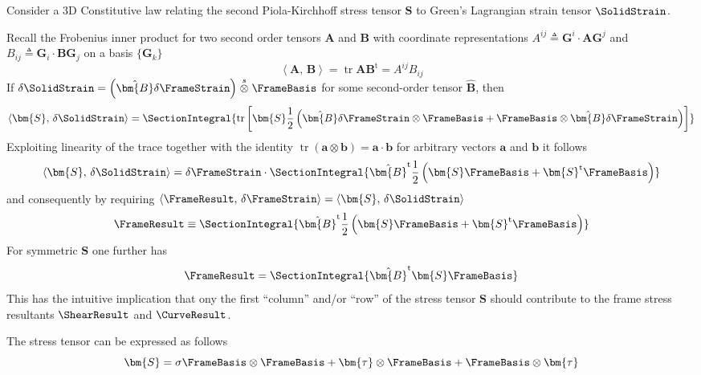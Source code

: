 Consider a 3D Constitutive law relating the second Piola-Kirchhoff stress tensor \(\bm{S}\) to Green's Lagrangian strain tensor \(\SolidStrain\).

Recall the Frobenius inner product for two second order tensors \(\bm{A}\) and \(\bm{B}\) with coordinate representations \(A^{ij} \triangleq \mathbf{G}^i\cdot \bm{A}\mathbf{G}^j\) and  \(B_{ij} \triangleq \mathbf{G}_i\cdot \bm{B}\mathbf{G}_j\) on a basis \(\{\mathbf{G}_k\}\)
\begin{equation*}
    \left<\bm{A},\,\bm{B}\right> = \operatorname{tr} \bm{A}\bm{B}^{\mathrm{t}} = A^{ij} B_{ij}
\end{equation*}
If \(\delta \SolidStrain = \left(\hat{\bm{B}} \delta\FrameStrain\right) \stackrel{s}{\otimes}\FrameBasis\) for some second-order tensor \(\hat{\bm{B}}\), then
\begin{equation*}
    \left<\bm{S},\,\delta\SolidStrain\right> = \SectionIntegral{ 
    \operatorname{tr} \left[\bm{S}\frac{1}{2}\left(\hat{\bm{B}}\delta \FrameStrain \otimes \FrameBasis + \FrameBasis\otimes \hat{\bm{B}}\delta \FrameStrain \right)
    \right]
    }
\end{equation*}
Exploiting linearity of the trace together with the identity \(\operatorname{tr} (\bm{a}\otimes\bm{b}) = \bm{a}\cdot \bm{b}\) for arbitrary vectors \(\bm{a}\) and \(\bm{b}\) it follows
\begin{equation*}
    \left<\bm{S},\,\delta\SolidStrain\right> = \delta \FrameStrain\cdot \SectionIntegral{
        \hat{\bm{B}}^{\mathrm{t}}\frac{1}{2}\left(\bm{S}\FrameBasis + \bm{S}^{\mathrm{t}}\FrameBasis\right)
    }
\end{equation*}
and consequently by requiring \(\left<\FrameResult,\,\delta\FrameStrain\right>=\left<\bm{S},\,\delta\SolidStrain\right>\)
\begin{equation*}
\FrameResult \equiv \SectionIntegral{\hat{\bm{B}}^{\mathrm{t}}\frac{1}{2}\left(\bm{S}\FrameBasis + \bm{S}^{\mathrm{t}}\FrameBasis\right)}
\end{equation*}
For symmetric \(\bm{S}\) one further has
\begin{equation}
\FrameResult = \SectionIntegral{
  \hat{\bm{B}}^{\mathrm{t}} \bm{S}\FrameBasis
}
\end{equation}
This has the intuitive implication that ony the first ``column'' and/or ``row'' of the stress tensor \(\bm{S}\) should contribute to the frame stress resultants \(\ShearResult\) and \(\CurveResult\).

The stress tensor can be expressed as follows
\begin{equation}
\bm{S}=\sigma \FrameBasis \otimes \FrameBasis+\bm{\tau} \otimes \FrameBasis+\FrameBasis \otimes \bm{\tau}
\label{eq:saint-venant-stress}
\end{equation}
